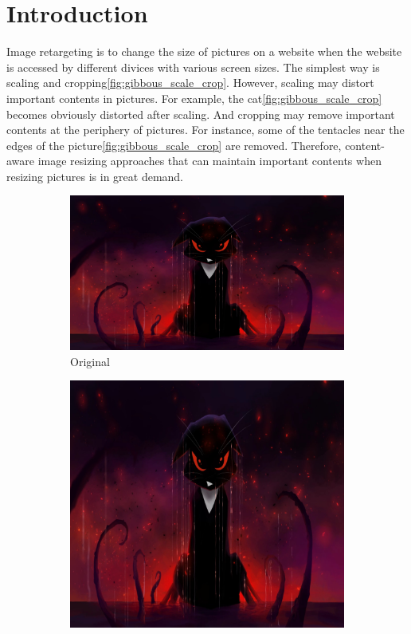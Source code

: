 \documentclass[final]{cvpr}
\begin{document}
\section{Introduction}
Image retargeting is to change the size of pictures on a website when the website is accessed by different divices with various screen sizes.
The simplest way is scaling and cropping\ref{fig:gibbous_scale_crop}.
However, scaling may distort important contents in pictures.
For example, the cat\ref{fig:gibbous_scale_crop} becomes obviously distorted after scaling.
And cropping may remove important contents at the periphery of pictures.
For instance, some of the tentacles near the edges of the picture\ref{fig:gibbous_scale_crop} are removed.
Therefore, content-aware image resizing approaches that can maintain important contents when resizing pictures is in great demand.
\begin{figure}[htb]
\begin{center}
\begin{subfigure}[b]{0.768\linewidth}
    \includegraphics[width=\textwidth]{gibbous.jpg}
    \caption{Original}
\end{subfigure}
\begin{subfigure}[b]{0.48\linewidth}
    \includegraphics[width=\textwidth]{gibbous_scaling.jpg}

\end{subfigure}
\end{center}
\end{figure}
\end{document}
